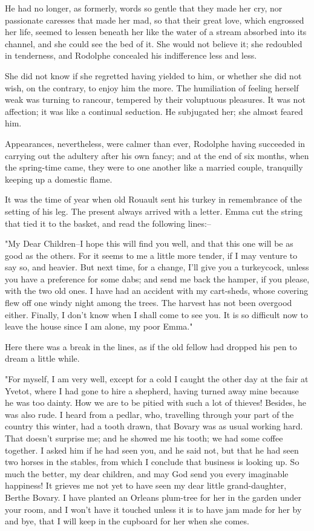 \documentclass{tufte-book}
\begin{document}
He had no longer, as formerly, words so gentle that they made her cry,
nor passionate caresses that made her mad, so that their great love,
which engrossed her life, seemed to lessen beneath her like the water of
a stream absorbed into its channel, and she could see the bed of it.
She would not believe it; she redoubled in tenderness, and Rodolphe
concealed his indifference less and less.

She did not know if she regretted having yielded to him, or whether she
did not wish, on the contrary, to enjoy him the more. The humiliation
of feeling herself weak was turning to rancour, tempered by their
voluptuous pleasures. It was not affection; it was like a continual
seduction. He subjugated her; she almost feared him.

Appearances, nevertheless, were calmer than ever, Rodolphe having
succeeded in carrying out the adultery after his own fancy; and at the
end of six months, when the spring-time came, they were to one another
like a married couple, tranquilly keeping up a domestic flame.

It was the time of year when old Rouault sent his turkey in remembrance
of the setting of his leg. The present always arrived with a letter.
Emma cut the string that tied it to the basket, and read the following
lines:--

"My Dear Children--I hope this will find you well, and that this one
will be as good as the others. For it seems to me a little more tender,
if I may venture to say so, and heavier. But next time, for a change,
I'll give you a turkeycock, unless you have a preference for some dabs;
and send me back the hamper, if you please, with the two old ones. I
have had an accident with my cart-sheds, whose covering flew off one
windy night among the trees. The harvest has not been overgood either.
Finally, I don't know when I shall come to see you. It is so difficult
now to leave the house since I am alone, my poor Emma."

Here there was a break in the lines, as if the old fellow had dropped
his pen to dream a little while.

"For myself, I am very well, except for a cold I caught the other day at
the fair at Yvetot, where I had gone to hire a shepherd, having turned
away mine because he was too dainty. How we are to be pitied with such
a lot of thieves! Besides, he was also rude. I heard from a pedlar, who,
travelling through your part of the country this winter, had a tooth
drawn, that Bovary was as usual working hard. That doesn't surprise me;
and he showed me his tooth; we had some coffee together. I asked him if
he had seen you, and he said not, but that he had seen two horses in the
stables, from which I conclude that business is looking up. So much
the better, my dear children, and may God send you every imaginable
happiness! It grieves me not yet to have seen my dear little
grand-daughter, Berthe Bovary. I have planted an Orleans plum-tree for
her in the garden under your room, and I won't have it touched unless it
is to have jam made for her by and bye, that I will keep in the cupboard
for her when she comes.
\end{document}
